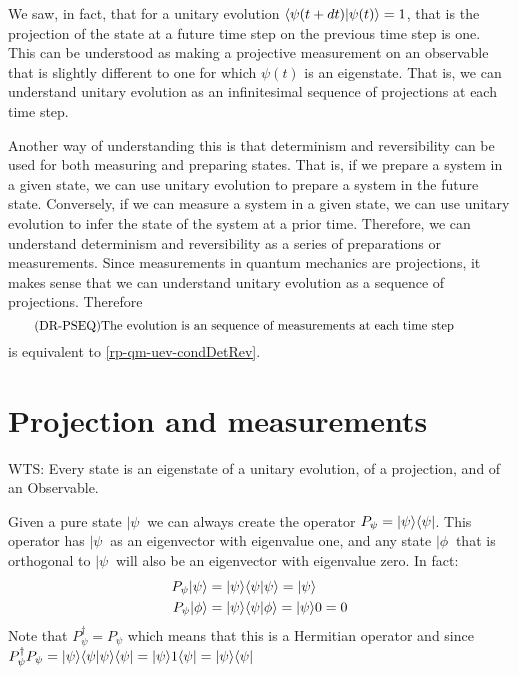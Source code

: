 We saw, in fact, that for a unitary evolution $\langle\psi(t+dt) | \psi(t)\rangle =1$, that is the projection of the state at a future time step on the previous time step is one. This can be understood as making a projective measurement on an observable that is slightly different to one for which $\psi(t)$ is an eigenstate. That is, we can understand unitary evolution as an infinitesimal sequence of projections at each time step.

Another way of understanding this is that determinism and reversibility can be used for both measuring and preparing states. That is, if we prepare a system in a given state, we can use unitary evolution to prepare a system in the future state. Conversely, if we can measure a system in a given state, we can use unitary evolution to infer the state of the system at a prior time. Therefore, we can understand determinism and reversibility as a series of preparations or measurements. Since measurements in quantum mechanics are projections, it makes sense that we can understand unitary evolution as a sequence of projections. Therefore 
\begin{equation}\label{rp-qm-uev-condProjectionSequence}
	\tag{DR-PSEQ}
	\eqtext{The evolution is an sequence of measurements at each time step} 
\end{equation}
is equivalent to \ref{rp-qm-uev-condDetRev}.

\section{Projection and measurements}


WTS: Every state is an eigenstate of a unitary evolution, of a projection, and of an Observable.

Given a pure state $|\psi \>$ we can always create the operator $P_{\psi}=|\psi \rangle \langle\psi|$. This operator has $|\psi\>$ as an eigenvector with eigenvalue one, and any state $|\phi\>$ that is orthogonal to $|\psi\>$ will also be an eigenvector with eigenvalue zero. In fact:
\begin{equation}
	\begin{aligned}
		P_{\psi} | \psi \rangle &= |\psi \rangle \langle\psi|\psi\rangle = |\psi \rangle \\
		P_{\psi} | \phi \rangle &= |\psi \rangle \langle\psi|\phi\rangle = |\psi \rangle 0 = 0 \\
	\end{aligned}
\end{equation}
Note that $P_{\psi}^\dagger = P_{\psi}$ which means that this is a Hermitian operator and since  $P_{\psi}^\dagger P_{\psi}  = |\psi \rangle \langle\psi|\psi\rangle \langle\psi| = |\psi \rangle 1 \langle\psi| = |\psi \rangle \langle\psi|$

